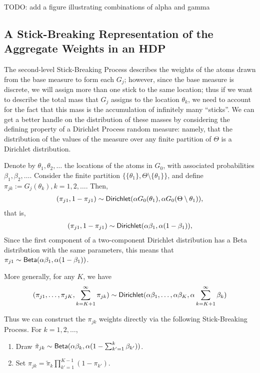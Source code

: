 TODO: add a figure illustrating combinations of alpha and gamma

\subsection{A Stick-Breaking Representation of the Aggregate Weights
  in an HDP}

The second-level Stick-Breaking Process describes the weights of the
atoms drawn from the base measure to form each $G_j$; however, since the base measure is
discrete, we will assign more than one stick to the same location;
thus if we want to describe the total mass that $G_j$ assigns to the
location $\theta_k$, we need to account for the fact that this mass is
the accumulation of infinitely many ``sticks''.  We can get a better
handle on the distribution of these masses by considering the defining
property of a Dirichlet Process random measure: namely, that the
distribution of the values of the measure over any finite partition of
$\Theta$ is a Dirichlet distribution.

Denote by $\theta_1, \theta_2, \dots$ the locations of the atoms in
$G_0$, with associated probabilities $\beta_1, \beta_2, \dots$.
Consider the finite partition $\{\{\theta_1\}, \Theta \setminus
\{\theta_1\}\}$, and define $\pi_{jk} := G_j(\theta_k), k = 1, 2,
\dots$.  Then,
\begin{align}
  (\pi_{j1}, 1 - \pi_{j1}) \sim \mathsf{Dirichlet}(\alpha
    G_0(\theta_1), \alpha G_0(\Theta \setminus \theta_1)),
\end{align}
that is,
\begin{align}
  (\pi_{j1}, 1 - \pi_{j1}) \sim \mathsf{Dirichlet}(\alpha
    \beta_1, \alpha (1 - \beta_1)),
\end{align}
Since the first component of a two-component Dirichlet distribution
has a Beta distribution with the same parameters, 
this means that $\pi_{j1} \sim \mathsf{Beta}(\alpha \beta_1,\alpha(1 -
  \beta_1))$.

More generally, for any $K$, we have
\begin{align}
  (\pi_{j1}, \dots, \pi_{jK}, \sum_{k=K+1}^{\infty} \pi_{jk}) \sim
  \mathsf{Dirichlet}(\alpha \beta_1, \dots, \alpha \beta_K, \alpha
    \sum_{k=K+1}^{\infty} \beta_k)
\end{align}

Thus we can construct the $\pi_{jk}$ weights directly via the
following Stick-Breaking Process.  For $k = 1, 2, \dots$,
  \begin{enumerate}
  \item \label{stick-step-1} Draw $\tilde{\pi}_{jk} \sim \mathsf{Beta}(\alpha
      \beta_k,\alpha (1 - \sum_{k'=1}^k \beta_{k'}))$.
  \item \label{stick-step-2} Set $\pi_{jk} = \tilde{\pi}_k \prod_{k'=1}^{K-1}
    (1 - \pi_{k'})$.
  \end{enumerate}

